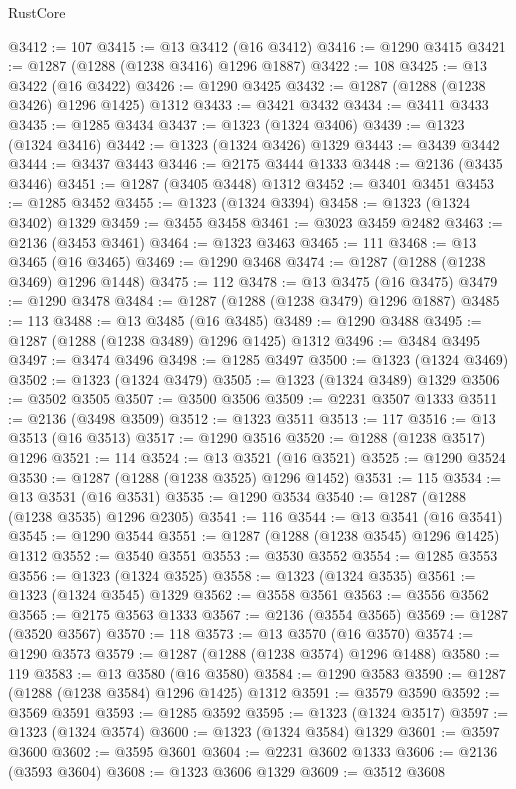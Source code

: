 \begin{lexlean}{RustCore}
\begin{coremodule}
@3412 := 107
@3415 := @13 @3412 (@16 @3412)
@3416 := @1290 @3415
@3421 := @1287 (@1288 (@1238 @3416) @1296 @1887)
@3422 := 108
@3425 := @13 @3422 (@16 @3422)
@3426 := @1290 @3425
@3432 := @1287 (@1288 (@1238 @3426) @1296 @1425) @1312
@3433 := @3421 @3432
@3434 := @3411 @3433
@3435 := @1285 @3434
@3437 := @1323 (@1324 @3406)
@3439 := @1323 (@1324 @3416)
@3442 := @1323 (@1324 @3426) @1329
@3443 := @3439 @3442
@3444 := @3437 @3443
@3446 := @2175 @3444 @1333
@3448 := @2136 (@3435 @3446)
@3451 := @1287 (@3405 @3448) @1312
@3452 := @3401 @3451
@3453 := @1285 @3452
@3455 := @1323 (@1324 @3394)
@3458 := @1323 (@1324 @3402) @1329
@3459 := @3455 @3458
@3461 := @3023 @3459 @2482
@3463 := @2136 (@3453 @3461)
@3464 := @1323 @3463
@3465 := 111
@3468 := @13 @3465 (@16 @3465)
@3469 := @1290 @3468
@3474 := @1287 (@1288 (@1238 @3469) @1296 @1448)
@3475 := 112
@3478 := @13 @3475 (@16 @3475)
@3479 := @1290 @3478
@3484 := @1287 (@1288 (@1238 @3479) @1296 @1887)
@3485 := 113
@3488 := @13 @3485 (@16 @3485)
@3489 := @1290 @3488
@3495 := @1287 (@1288 (@1238 @3489) @1296 @1425) @1312
@3496 := @3484 @3495
@3497 := @3474 @3496
@3498 := @1285 @3497
@3500 := @1323 (@1324 @3469)
@3502 := @1323 (@1324 @3479)
@3505 := @1323 (@1324 @3489) @1329
@3506 := @3502 @3505
@3507 := @3500 @3506
@3509 := @2231 @3507 @1333
@3511 := @2136 (@3498 @3509)
@3512 := @1323 @3511
@3513 := 117
@3516 := @13 @3513 (@16 @3513)
@3517 := @1290 @3516
@3520 := @1288 (@1238 @3517) @1296
@3521 := 114
@3524 := @13 @3521 (@16 @3521)
@3525 := @1290 @3524
@3530 := @1287 (@1288 (@1238 @3525) @1296 @1452)
@3531 := 115
@3534 := @13 @3531 (@16 @3531)
@3535 := @1290 @3534
@3540 := @1287 (@1288 (@1238 @3535) @1296 @2305)
@3541 := 116
@3544 := @13 @3541 (@16 @3541)
@3545 := @1290 @3544
@3551 := @1287 (@1288 (@1238 @3545) @1296 @1425) @1312
@3552 := @3540 @3551
@3553 := @3530 @3552
@3554 := @1285 @3553
@3556 := @1323 (@1324 @3525)
@3558 := @1323 (@1324 @3535)
@3561 := @1323 (@1324 @3545) @1329
@3562 := @3558 @3561
@3563 := @3556 @3562
@3565 := @2175 @3563 @1333
@3567 := @2136 (@3554 @3565)
@3569 := @1287 (@3520 @3567)
@3570 := 118
@3573 := @13 @3570 (@16 @3570)
@3574 := @1290 @3573
@3579 := @1287 (@1288 (@1238 @3574) @1296 @1488)
@3580 := 119
@3583 := @13 @3580 (@16 @3580)
@3584 := @1290 @3583
@3590 := @1287 (@1288 (@1238 @3584) @1296 @1425) @1312
@3591 := @3579 @3590
@3592 := @3569 @3591
@3593 := @1285 @3592
@3595 := @1323 (@1324 @3517)
@3597 := @1323 (@1324 @3574)
@3600 := @1323 (@1324 @3584) @1329
@3601 := @3597 @3600
@3602 := @3595 @3601
@3604 := @2231 @3602 @1333
@3606 := @2136 (@3593 @3604)
@3608 := @1323 @3606 @1329
@3609 := @3512 @3608

\end{coremodule}
\end{lexlean}
